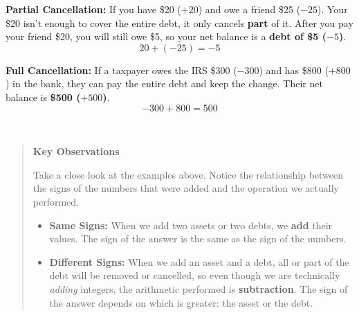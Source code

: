 \documentclass{ximera}[font=12pt]
\begin{document}
\begin{example}
    \textbf{Partial Cancellation:} If you have \$20 ($+20$) and owe a friend \$25 ($-25$). Your \$20 isn't enough to 
    cover the entire debt, it only cancels \textbf{part} of it.  After you pay your friend \$20, you will still owe \$5, so
    your net balance is a \textbf{debt of \$5 ($-5$)}.
    \[ 20 + (-25) = -5 \]
\end{example}

\begin{example}
    \textbf{Full Cancellation:} If a taxpayer owes the IRS \$300 ($-300$) and has \$800 ($+800$) in the bank, they can pay the 
    entire debt and keep the change. Their net balance is \textbf{\$500 ($+500$)}.
    \[ -300 + 800 = 500 \]
\end{example}


\mbox{} \\[2pt]

\begin{quote}
\textbf{Key Observations}


Take a close look at the examples above. Notice the relationship between the signs of the numbers that were added and the operation we actually performed.

\begin{itemize}
    \item \textbf{Same Signs:} When we add two assets or two debts, we \textbf{add} their values.  The sign of the answer is the same as the sign of the numbers.

    \item \textbf{Different Signs:} When we add an asset and a debt, all or part of the debt will be removed or cancelled, so even though we are technically \emph{adding} integers, the arithmetic performed is \textbf{subtraction}.  The sign of the answer depends on which is greater: the asset or the debt.
\end{itemize}


\end{quote}
\end{document}
